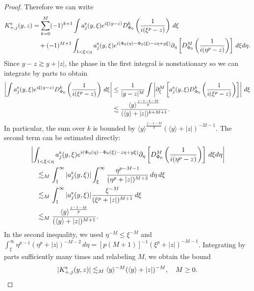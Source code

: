 \documentclass[11pt]{amsart}
\theoremstyle{definition}
\theoremstyle{remark}
\numberwithin{equation}{section}
\newcommand{\ang}[1]{\langle #1 \rangle}
\begin{document}
\begin{proof}
    Therefore we can write
    \begin{align*}
        K_{+,j}^{\textup{s}}(y, z) & = \sum_{k = 0}^{M}(-1)^{k + 1}\int a_j^{\textup{s}}(y, \xi)e^{i\xi(y - z)}D_{\Phi_0}^k\left(\frac{1}{i(\xi^p - z)}\right)\,d\xi \\ & \quad + (-1)^{M+1}\int_{1 < \xi < \eta}a_j^{\textup{s}}(y, \xi)e^{i(\Phi_0(\eta) - \Phi_0(\xi) - z\eta + y\xi)}\partial_\eta\left[D_{\Phi_0}^{M}\left(\frac{1}{i(\eta^p - z)}\right)\right]\,d\xi d\eta.
    \end{align*}
    Since $y - z  \gtrsim y + |z|$, the phase in the first integral is nonstationary so we can integrate by parts to obtain 
    \begin{equation}\label{eqn:linear_stationary_boundary_ibp}
        \begin{aligned}\left|\int a_j^{\textup{s}}(y, \xi)e^{i\xi(y-z)}D_{\Phi_0}^k\left(\frac{1}{i(\xi^p-z)}\right)\,d\xi\right| 
            & \leq \frac{1}{|y-z|^M}\int\left|\partial_\xi^M\left[a_j^{\textup{s}}(y, \xi)D_{\Phi_0}^k\left(\frac{1}{i(\xi^p-z)}\right)\right]\right|\,d\xi \\ 
            & \lesssim \frac{\ang{y}^{\frac{j-1-k-M}{p}}}{(\ang{y}+|z|)^{k+M+1}}.\end{aligned}
    \end{equation} 
    In particular, the sum over $k$ is bounded by $\ang{y}^{\frac{j - 1 - M}{p}}(\ang{y} + |z|)^{-M-1}$. The second term can be estimated directly:
    \begin{equation}\label{eqn:linear_stationary_remainder_bound}
        \begin{aligned}&\left|\int_{1 < \xi < \eta}a_j^{\textup{s}}(y, \xi)e^{i(\Phi_0(\eta) - \Phi_0(\xi) - z\eta + y\xi)}\partial_\eta\left[D_{\Phi_0}^{M}\left(\frac{1}{i(\eta^p-z)}\right)\right]\,d\xi d\eta\right| \\ &\quad \lesssim_M \int_1^\infty |a_j^{\textup{s}}(y, \xi)|\int_\xi^\infty \frac{\eta^{p-M-1}}{(\eta^p+|z|)^{M+2}}\,d\eta\,d\xi \\ &\quad \lesssim_M \int_1^\infty |a_j^{\textup{s}}(y, \xi)|\frac{\xi^{-M}}{(\xi^p+|z|)^{M+1}}\,d\xi \\ &\quad \lesssim_M \frac{\ang{y}^{\frac{j-1-M}{p}}}{(\ang{y}+|z|)^{M+1}}.
        \end{aligned}
    \end{equation} 
    In the second inequality, we used $\eta^{-M}\leq\xi^{-M}$ and $\int_\xi^\infty\eta^{p-1}(\eta^p+|z|)^{-M-2}\,d\eta=[p(M+1)]^{-1}(\xi^p+|z|)^{-M-1}$. Integrating by parts sufficiently many times and relabeling $M$, we obtain the bound 
    \[|K_{+,j}^{\textup{s}}(y, z)| \lesssim_M \ang{y}^{-M}(\ang{y} + |z|)^{-M}, \quad M \geq 0.\]
\end{proof}
\end{document}
